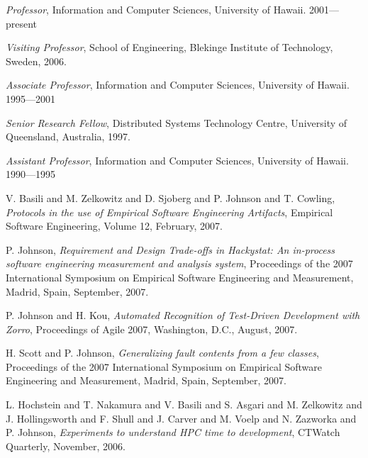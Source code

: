 \begin{Appointments}
\item {\em Professor},  Information and Computer
  Sciences, University of Hawaii.  2001---present

\item {\em Visiting Professor}, School of Engineering, Blekinge Institute of Technology, Sweden, 2006.

\item {\em Associate Professor},  Information and Computer
  Sciences, University of Hawaii.  1995---2001

\item {\em Senior Research Fellow},  Distributed Systems Technology Centre,
University of Queensland, Australia, 1997.

\item {\em Assistant Professor},   Information and Computer
  Sciences, University of Hawaii.  1990---1995

\end{Appointments}




\begin{Publications: Closely Related}
  
\item V. Basili and M. Zelkowitz and D. Sjoberg and P. Johnson and T. Cowling,
{\em Protocols in the use of Empirical Software Engineering Artifacts}, 
Empirical Software Engineering, Volume 12, February, 2007.

\item P. Johnson, {\em Requirement and Design Trade-offs in Hackystat: An
in-process software engineering measurement and analysis system},
Proceedings of the 2007 International Symposium on Empirical Software
Engineering and Measurement, Madrid, Spain, September, 2007.

\item P. Johnson and H. Kou, {\em Automated Recognition of Test-Driven Development with Zorro}, 
Proceedings of Agile 2007, Washington, D.C., August, 2007. 

\item H. Scott and P. Johnson, {\em Generalizing fault contents from a few
classes}, Proceedings of the 2007 International Symposium on Empirical
Software Engineering and Measurement, Madrid, Spain, September, 2007.

\item L. Hochstein and T. Nakamura and V. Basili and S. Asgari and 
M. Zelkowitz and J. Hollingsworth and F. Shull and J. Carver and 
M. Voelp and N. Zazworka and P. Johnson, {\em Experiments to 
understand HPC time to development}, CTWatch Quarterly, 
November, 2006.

\end{Publications: Closely Related}



